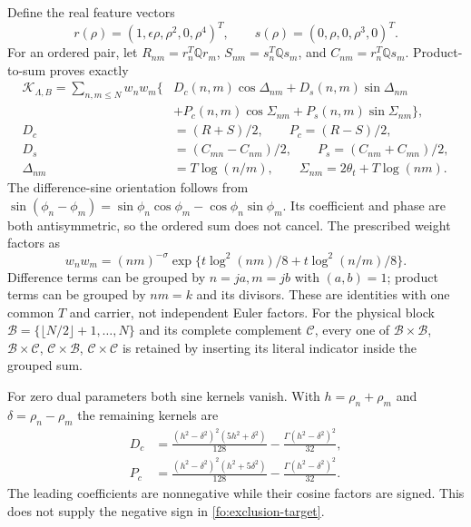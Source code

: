 \documentclass[11pt]{article}
\numberwithin{equation}{section}
\theoremstyle{definition}
\theoremstyle{remark}
\begin{document}
Define the real feature vectors
\begin{equation}
r(\rho)=(1,\epsilon\rho,\rho^2,0,\rho^4)^T,
\qquad s(\rho)=(0,\rho,0,\rho^3,0)^T.
\end{equation}
For an ordered pair, let $R_{nm}=r_n^T\mathbb Qr_m$,
$S_{nm}=s_n^T\mathbb Qs_m$, and $C_{nm}=r_n^T\mathbb Qs_m$.
Product-to-sum proves exactly
\begin{align}
\mathcal K_{\Lambda,B}=\sum_{n,m\le N}w_nw_m\{&
D_c(n,m)\cos\Delta_{nm}+D_s(n,m)\sin\Delta_{nm}\nonumber\\
&+P_c(n,m)\cos\Sigma_{nm}+P_s(n,m)\sin\Sigma_{nm}\},
\label{fo:four-channels}\\
D_c&=(R+S)/2,\qquad P_c=(R-S)/2,\nonumber\\
D_s&=(C_{mn}-C_{nm})/2,\qquad
P_s=(C_{nm}+C_{mn})/2,\nonumber\\
\Delta_{nm}&=T\log(n/m),\qquad
\Sigma_{nm}=2\theta_t+T\log(nm).\nonumber
\end{align}
The difference-sine orientation follows from
$\sin(\phi_n-\phi_m)=\sin\phi_n\cos\phi_m-\cos\phi_n\sin\phi_m$.
Its coefficient and phase are both antisymmetric, so the ordered
sum does not cancel.  The prescribed weight factors as
\begin{equation}
w_nw_m=(nm)^{-\sigma}
  \exp\{t\log^2(nm)/8+t\log^2(n/m)/8\}.
\label{fo:pair-weight}
\end{equation}
Difference terms can be grouped by $n=ja,m=jb$ with $(a,b)=1$;
product terms can be grouped by $nm=k$ and its divisors.  These are
identities with one common $T$ and carrier, not independent Euler
factors.  For the physical block
$\mathcal B=\{\lfloor N/2\rfloor+1,\ldots,N\}$ and its complete
complement $\mathcal C$, every one of
$\mathcal B\times\mathcal B$, $\mathcal B\times\mathcal C$,
$\mathcal C\times\mathcal B$, $\mathcal C\times\mathcal C$
is retained by inserting its literal indicator inside the grouped sum.

For zero dual parameters both sine kernels vanish.  With
$h=\rho_n+\rho_m$ and $\delta=\rho_n-\rho_m$ the remaining kernels are
\begin{align}
D_c&=\frac{(h^2-\delta^2)^2(5h^2+\delta^2)}{128}
                  -\frac{\Gamma(h^2-\delta^2)^2}{32},\nonumber\\
P_c&=\frac{(h^2-\delta^2)^2(h^2+5\delta^2)}{128}
                  -\frac{\Gamma(h^2-\delta^2)^2}{32}.
\label{fo:base-kernels}
\end{align}
The leading coefficients are nonnegative while their cosine factors are
signed.  This does not supply the negative sign in
\eqref{fo:exclusion-target}.
\end{document}
